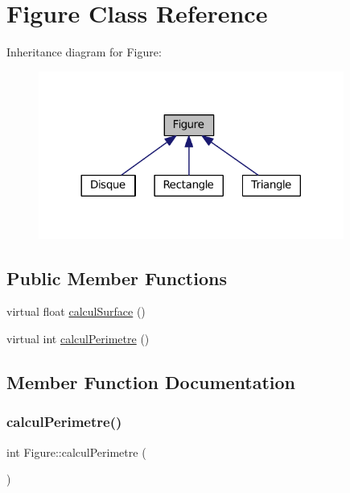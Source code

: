 \hypertarget{classFigure}{}\section{Figure Class Reference}
\label{classFigure}


Inheritance diagram for Figure\+:
\nopagebreak
\begin{figure}[H]
\begin{center}
\leavevmode
\includegraphics[width=284pt]{classFigure__inherit__graph}
\end{center}
\end{figure}
\subsection*{Public Member Functions}
\begin{DoxyCompactItemize}
\item 
virtual float \hyperlink{classFigure_aa099ec99ff69eb0e4f989af6a8ea9350}{calcul\+Surface} ()
\item 
virtual int \hyperlink{classFigure_aa44c45980a77a4ffd8f37a2ef88c747f}{calcul\+Perimetre} ()
\end{DoxyCompactItemize}


\subsection{Member Function Documentation}
\mbox{\label{classFigure_aa44c45980a77a4ffd8f37a2ef88c747f}} 
\subsubsection{\texorpdfstring{calcul\+Perimetre()}{calculPerimetre()}}
{\footnotesize\ttfamily int Figure\+::calcul\+Perimetre (\begin{DoxyParamCaption}{ }\end{DoxyParamCaption})\hspace{0.3cm}{\ttfamily [virtual]}}

